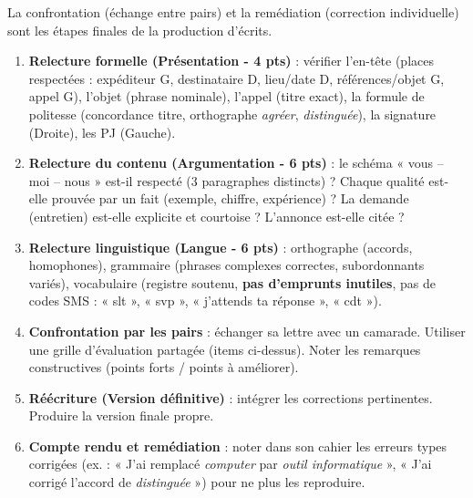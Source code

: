 \documentclass[11pt]{article}
\begin{document}
\begin{methode}
La confrontation (échange entre pairs) et la remédiation (correction individuelle) sont les étapes finales de la production d'écrits.
\begin{enumerate}
\item \textbf{Relecture formelle (Présentation - 4 pts)} : vérifier l'en-tête (places respectées : expéditeur G, destinataire D, lieu/date D, références/objet G, appel G), l'objet (phrase nominale), l'appel (titre exact), la formule de politesse (concordance titre, orthographe \emph{agréer}, \emph{distinguée}), la signature (Droite), les PJ (Gauche).
\item \textbf{Relecture du contenu (Argumentation - 6 pts)} : le schéma « vous – moi – nous » est-il respecté (3 paragraphes distincts) ? Chaque qualité est-elle prouvée par un fait (exemple, chiffre, expérience) ? La demande (entretien) est-elle explicite et courtoise ? L'annonce est-elle citée ?
\item \textbf{Relecture linguistique (Langue - 6 pts)} : orthographe (accords, homophones), grammaire (phrases complexes correctes, subordonnants variés), vocabulaire (registre soutenu, \textbf{pas d'emprunts inutiles}, pas de codes SMS : « slt », « svp », « j'attends ta réponse », « cdt »).
\item \textbf{Confrontation par les pairs} : échanger sa lettre avec un camarade. Utiliser une grille d'évaluation partagée (items ci-dessus). Noter les remarques constructives (points forts / points à améliorer).
\item \textbf{Réécriture (Version définitive)} : intégrer les corrections pertinentes. Produire la version finale propre.
\item \textbf{Compte rendu et remédiation} : noter dans son cahier les erreurs types corrigées (ex. : « J'ai remplacé \emph{computer} par \emph{outil informatique} », « J'ai corrigé l'accord de \emph{distinguée} ») pour ne plus les reproduire.
\end{enumerate}
\end{methode}
\end{document}
